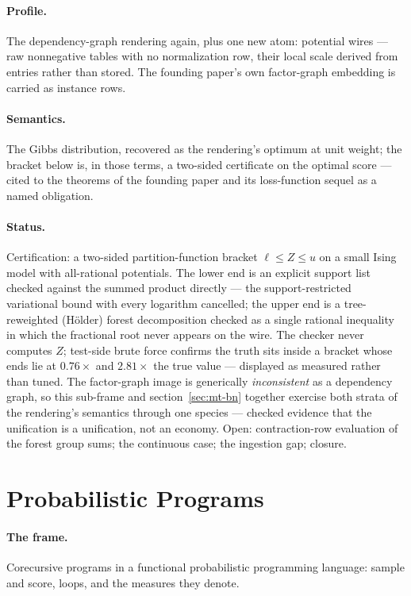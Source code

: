 \paragraph{Profile.} The dependency-graph rendering again, plus one
new atom: potential wires --- raw nonnegative tables with no
normalization row, their local scale derived from entries rather
than stored. The founding paper's own factor-graph embedding is
carried as instance rows.

\paragraph{Semantics.} The Gibbs distribution, recovered as the
rendering's optimum at unit weight; the bracket below is, in those
terms, a two-sided certificate on the optimal score --- cited to the
theorems of the founding paper and its loss-function sequel
\cite{richardson20, richardson22} as a named obligation.

\paragraph{Status.} Certification: a two-sided partition-function
bracket $\ell \le Z \le u$ on a small Ising model with all-rational
potentials. The lower end is an explicit support list checked
against the summed product directly --- the support-restricted
variational bound with every logarithm cancelled; the upper end is a
tree-reweighted (H\"older) forest decomposition checked as a single
rational inequality in which the fractional root never appears on
the wire. The checker never computes $Z$; test-side brute force confirms
the truth sits inside a bracket whose ends lie at $0.76\times$ and
$2.81\times$ the true value --- displayed as measured rather than
tuned. The factor-graph image is
generically \emph{inconsistent} as a dependency graph, so this
sub-frame and section~\ref{sec:mt-bn} together exercise both strata
of the rendering's semantics through one species --- checked
evidence that the unification is a unification, not an economy.
Open: contraction-row evaluation of the forest group sums; the
continuous case; the ingestion gap; closure.

\section{Probabilistic Programs}
\label{sec:mt-ppl}

\paragraph{The frame.} Corecursive programs in a functional
probabilistic programming language: \textsf{sample} and
\textsf{score}, loops, and the measures they denote.

